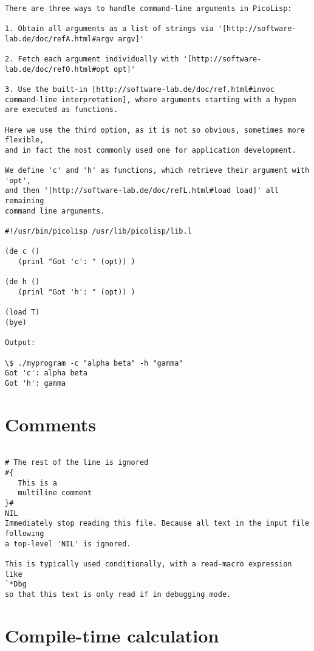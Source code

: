 \begin{verbatim}

There are three ways to handle command-line arguments in PicoLisp:

1. Obtain all arguments as a list of strings via '[http://software-lab.de/doc/refA.html#argv argv]'

2. Fetch each argument individually with '[http://software-lab.de/doc/refO.html#opt opt]'

3. Use the built-in [http://software-lab.de/doc/ref.html#invoc command-line interpretation], where arguments starting with a hypen are executed as functions.

Here we use the third option, as it is not so obvious, sometimes more flexible,
and in fact the most commonly used one for application development.

We define 'c' and 'h' as functions, which retrieve their argument with 'opt',
and then '[http://software-lab.de/doc/refL.html#load load]' all remaining
command line arguments.

#!/usr/bin/picolisp /usr/lib/picolisp/lib.l

(de c ()
   (prinl "Got 'c': " (opt)) )

(de h ()
   (prinl "Got 'h': " (opt)) )

(load T)
(bye)

Output:

\$ ./myprogram -c "alpha beta" -h "gamma"
Got 'c': alpha beta
Got 'h': gamma

\end{verbatim}

\section*{Comments}

\begin{verbatim}

# The rest of the line is ignored
#{
   This is a
   multiline comment
}#
NIL
Immediately stop reading this file. Because all text in the input file following
a top-level 'NIL' is ignored.

This is typically used conditionally, with a read-macro expression like
`*Dbg
so that this text is only read if in debugging mode.

\end{verbatim}

\section*{Compile-time calculation}

